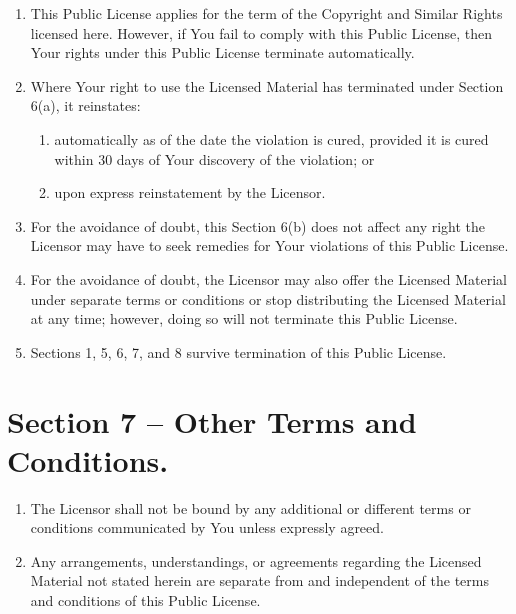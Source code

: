 \begin{enumerate}[label=\alph*.]
  \item This Public License applies for the term of the Copyright and Similar Rights licensed here. However, if You fail to comply with this Public License, then Your rights under this Public License terminate automatically.

  \item Where Your right to use the Licensed Material has terminated under Section 6(a), it reinstates:

  \begin{enumerate}[label=\arabic*.]
    \item automatically as of the date the violation is cured, provided it is cured within 30 days of Your discovery of the violation; or

    \item upon express reinstatement by the Licensor.
  \end{enumerate}

  \item For the avoidance of doubt, this Section 6(b) does not affect any right the Licensor may have to seek remedies for Your violations of this Public License.

  \item For the avoidance of doubt, the Licensor may also offer the Licensed Material under separate terms or conditions or stop distributing the Licensed Material at any time; however, doing so will not terminate this Public License.

  \item Sections 1, 5, 6, 7, and 8 survive termination of this Public License.
\end{enumerate}

\section{Section 7 – Other Terms and Conditions.}
\label{section7}

\begin{enumerate}[label=\alph*.]
  \item The Licensor shall not be bound by any additional or different terms or conditions communicated by You unless expressly agreed.

  \item Any arrangements, understandings, or agreements regarding the Licensed Material not stated herein are separate from and independent of the terms and conditions of this Public License.
\end{enumerate}

